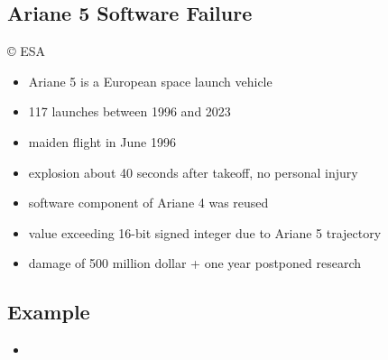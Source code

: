 \subsection{Ariane 5 Software Failure} %
\begin{frame}{\insertsubsection}
	\begin{fancycolumns}[widths={35}]
	\nextcolumn
		\centering{} {\tiny\copyright{} ESA} %
		\begin{definition}{\insertsubsection{}}
			\begin{itemize}
				\item Ariane 5 is a European space launch vehicle
				\item 117 launches between 1996 and 2023
				\item maiden flight in June 1996
				\item explosion about 40 seconds after takeoff, no personal injury
				\item software component of Ariane 4 was reused
				\item value exceeding 16-bit signed integer due to Ariane 5 trajectory
				\item damage of 500 million dollar + one year postponed research
			\end{itemize}
		\end{definition}
	\end{fancycolumns}
\end{frame}

\subsection{Example}
\begin{frame}{\insertsubsection}
	\begin{fancycolumns}
		\begin{definition}{\insertsubsection}
			\begin{itemize}
				\item 
			\end{itemize}
		\end{definition}
		\nextcolumn
	\end{fancycolumns}
\end{frame}

